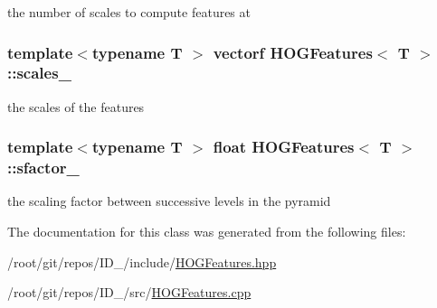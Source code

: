 the number of scales to compute features at 

\hypertarget{classHOGFeatures_a27490a8c33c7ffbfdeedafc5af0ad544}{
\subsubsection[{scales\-\_\-}]{\setlength{\rightskip}{0pt plus 5cm}template$<$typename T $>$ {\bf vectorf} {\bf \-H\-O\-G\-Features}$<$ \-T $>$\-::{\bf scales\-\_\-}}}\label{classHOGFeatures_a27490a8c33c7ffbfdeedafc5af0ad544}


the scales of the features 

\hypertarget{classHOGFeatures_a45b232ca94e93b4f30d342374e62578f}{
\subsubsection[{sfactor\-\_\-}]{\setlength{\rightskip}{0pt plus 5cm}template$<$typename T $>$ float {\bf \-H\-O\-G\-Features}$<$ \-T $>$\-::{\bf sfactor\-\_\-}}}\label{classHOGFeatures_a45b232ca94e93b4f30d342374e62578f}


the scaling factor between successive levels in the pyramid 



\-The documentation for this class was generated from the following files\-:\begin{DoxyCompactItemize}
\item 
/root/git/repos/\-I\-D\-\_/include/\hyperlink{HOGFeatures_8hpp}{\-H\-O\-G\-Features.\-hpp}\item 
/root/git/repos/\-I\-D\-\_/src/\hyperlink{HOGFeatures_8cpp}{\-H\-O\-G\-Features.\-cpp}\end{DoxyCompactItemize}
